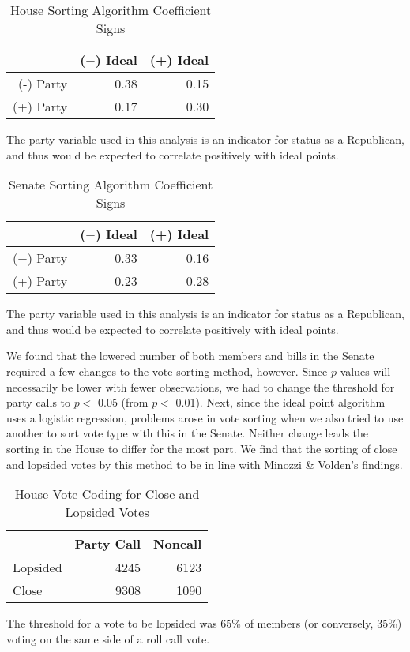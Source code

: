 \documentclass[12pt]{article}
\newcommand\fnote[1]{\captionsetup{font=small}\caption*{#1}}
\begin{document}
\begin{table}[H]
	\centering
	\singlespacing
	\caption{House Sorting Algorithm Coefficient Signs}
	\begin{tabular}{rrr}
		\hline
		& ($-$) Ideal & (+) Ideal \\ 
		\hline
		(-) Party & 0.38 & 0.15 \\ 
		(+) Party & 0.17 & 0.30 \\ 
		\hline
	\end{tabular}
	\fnote{The party variable used in this analysis is an indicator for status as a Republican, and thus would be expected to correlate positively with ideal points.}
\end{table}

\begin{table}[H]
	\centering
	\singlespacing
	\caption{Senate Sorting Algorithm Coefficient Signs}
	\begin{tabular}{rrr}
		\hline
		& ($-$) Ideal & (+) Ideal \\ 
		\hline
		($-$) Party & 0.33 & 0.16 \\ 
		(+) Party & 0.23 & 0.28 \\ 
		\hline
	\end{tabular}
	\fnote{The party variable used in this analysis is an indicator for status as a Republican, and thus would be expected to correlate positively with ideal points.}
\end{table}

We found that the lowered number of both members and bills in the Senate required a few changes to the vote sorting method, however. Since $p$-values will necessarily be lower with fewer observations, we had to change the threshold for party calls to $p <$ 0.05 (from $p <$ 0.01). Next, since the ideal point algorithm uses a logistic regression, problems arose in vote sorting when we also tried to use another to sort vote type with this in the Senate. Neither change leads the sorting in the House to differ for the most part. We find that the sorting of close and lopsided votes by this method to be in line with Minozzi \& Volden's findings.

\begin{table}[H]
	\centering
	\singlespacing
	\caption{House Vote Coding for Close and Lopsided Votes} 
	\begin{tabular}{lrr}
		\hline
		& Party Call & Noncall \\ 
		\hline
		Lopsided & 4245 & 6123 \\ 
		Close & 9308 & 1090 \\ 
		\hline
	\end{tabular}
	\fnote{The threshold for a vote to be lopsided was 65\% of members (or conversely, 35\%) voting on the same side of a roll call vote.}
\end{table}
\end{document}
